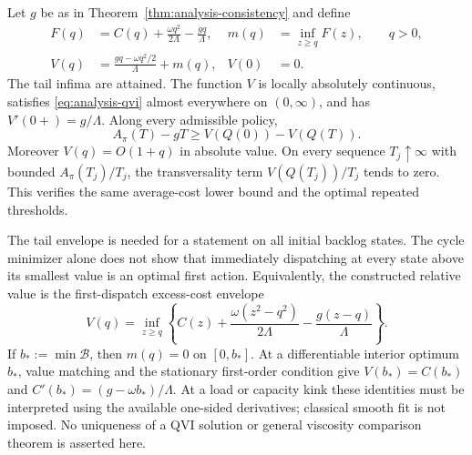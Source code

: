\begin{theorem}
\label{thm:analysis-qvi}
Let $g$ be as in Theorem~\ref{thm:analysis-consistency} and define
\begin{align}
 F(q)&=C(q)+\frac{\omega q^2}{2\Lambda}-\frac{gq}{\Lambda},
 &m(q)&=\inf_{z\ge q}F(z),\qquad q>0,
 \label{eq:analysis-tail-envelope}\\
 V(q)&=\frac{gq-\omega q^2/2}{\Lambda}+m(q),
 &V(0)&=0.
 \label{eq:analysis-value}
\end{align}
The tail infima are attained. The function $V$ is locally absolutely
continuous, satisfies \eqref{eq:analysis-qvi} almost everywhere on
$(0,\infty)$, and has $V'(0+)=g/\Lambda$. Along every admissible policy,
\begin{equation}
 A_\pi(T)-gT\ge V(Q(0))-V(Q(T)).
 \label{eq:analysis-verification-bound}
\end{equation}
Moreover $V(q)=O(1+q)$ in absolute value. On every sequence $T_j\uparrow\infty$
with bounded $A_\pi(T_j)/T_j$, the transversality term
$V(Q(T_j))/T_j$ tends to zero. This verifies the same average-cost lower
bound and the optimal repeated thresholds.
\end{theorem}

The tail envelope is needed for a statement on all initial backlog states.
The cycle minimizer alone does not show that immediately dispatching at
every state above its smallest value is an optimal first action. Equivalently,
the constructed relative value is the first-dispatch excess-cost envelope
\begin{equation}
 V(q)=\inf_{z\ge q}\left\{C(z)
       +\frac{\omega(z^2-q^2)}{2\Lambda}
       -\frac{g(z-q)}{\Lambda}\right\}.
 \label{eq:analysis-first-dispatch}
\end{equation}
If $b_*:=\min\mathcal B$, then $m(q)=0$ on $[0,b_*]$. At a differentiable
interior optimum $b_*$, value matching and the stationary first-order
condition give $V(b_*)=C(b_*)$ and
$C'(b_*)=(g-\omega b_*)/\Lambda$. At a load or capacity kink these
identities must be interpreted using the available one-sided derivatives;
classical smooth fit is not imposed. No uniqueness of a QVI solution or
general viscosity comparison theorem is asserted here.

